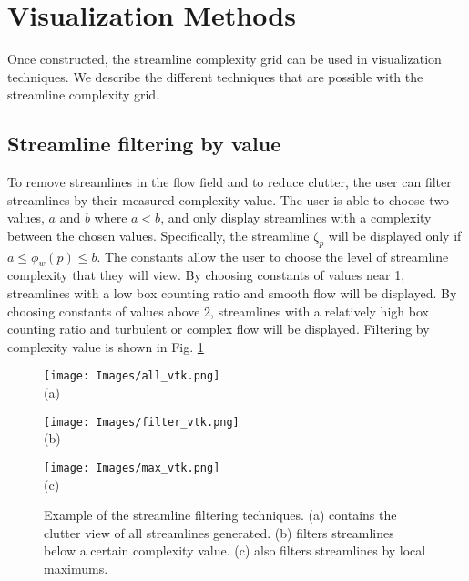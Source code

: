 \documentclass{egpubl}
\begin{document}
\section{Visualization Methods}

Once constructed, the streamline complexity grid can be used in visualization techniques.
We describe the different techniques that are possible with the streamline complexity grid.

\subsection{Streamline filtering by value}
To remove streamlines in the flow field and to reduce clutter, the user can filter streamlines by their measured complexity value.
The user is able to choose two values, $a$ and $b$ where $a < b$, and only display streamlines with a complexity between the chosen values. 
Specifically, the streamline $\zeta_p$ will be displayed only if $a \leq \phi_w(p) \leq b$.
The constants allow the user to choose the level of streamline complexity that they will view.
By choosing constants of values near 1, streamlines with a low box counting ratio and smooth flow will be displayed.
By choosing constants of values above 2, streamlines with a relatively high box counting ratio and turbulent or complex flow will be displayed.
Filtering by complexity value is shown in Fig. \ref{fig:value_filter}

\begin{figure}[h]
        \centering
                \begin{minipage}{0.30\linewidth}
                        \small \centering
                       	\texttt{[image: Images/all\_vtk.png]}\\(a)
                \end{minipage}
                \begin{minipage}{0.30\linewidth}
                        \small \centering
                        \texttt{[image: Images/filter\_vtk.png]}\\(b)
                \end{minipage}
                \begin{minipage}{0.30\linewidth}
                        \small \centering
                        \texttt{[image: Images/max\_vtk.png]}\\(c)
                \end{minipage}
        \caption{Example of the streamline filtering techniques. (a) contains the clutter view of all streamlines generated. (b) filters streamlines below a certain complexity value. (c) also filters streamlines by local maximums.}
        \label{fig:value_filter}
\end{figure}
\end{document}
